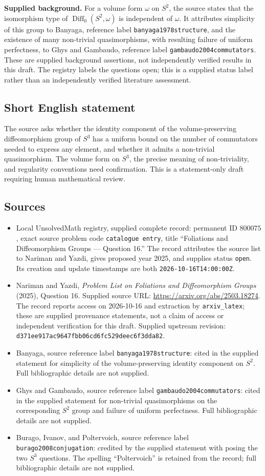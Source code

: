 \documentclass[11pt]{article}
\begin{document}
\textbf{Supplied background.} For a volume form \(\omega\) on \(S^2\), the source states that the isomorphism type of \(\operatorname{Diff}_0(S^2,\omega)\) is independent of \(\omega\). It attributes simplicity of this group to Banyaga, reference label \texttt{banyaga1978structure}, and the existence of many non-trivial quasimorphisms, with resulting failure of uniform perfectness, to Ghys and Gambaudo, reference label \texttt{gambaudo2004commutators}. These are supplied background assertions, not independently verified results in this draft. The registry labels the questions open; this is a supplied status label rather than an independently verified literature assessment.
\subsection{Short English statement}
The source asks whether the identity component of the volume-preserving diffeomorphism group of \(S^3\) has a uniform bound on the number of commutators needed to express any element, and whether it admits a non-trivial quasimorphism. The volume form on \(S^3\), the precise meaning of non-triviality, and regularity conventions need confirmation. This is a statement-only draft requiring human mathematical review.
\subsection{Sources}
\begin{itemize}
\item Local UnsolvedMath registry, supplied complete record: permanent ID \(800075\), exact source problem code \texttt{catalogue entry}, title ``Foliations and Diffeomorphism Groups --- Question 16.'' The record attributes the source list to Nariman and Yazdi, gives proposed year 2025, and supplies status \texttt{open}. Its creation and update timestamps are both \texttt{2026-10-16T14:00:00Z}.
\item Nariman and Yazdi, \emph{Problem List on Foliations and Diffeomorphism Groups} (2025), Question 16. Supplied source URL: \url{https://arxiv.org/abs/2503.18274}. The record reports access on 2026-10-16 and extraction by \texttt{arxiv\_latex}; these are supplied provenance statements, not a claim of access or independent verification for this draft. Supplied upstream revision: \texttt{d371ee917ac9647fbb06cd6fc529deec6f3dda82}.
\item Banyaga, source reference label \texttt{banyaga1978structure}: cited in the supplied statement for simplicity of the volume-preserving identity component on \(S^2\). Full bibliographic details are not supplied.
\item Ghys and Gambaudo, source reference label \texttt{gambaudo2004commutators}: cited in the supplied statement for non-trivial quasimorphisms on the corresponding \(S^2\) group and failure of uniform perfectness. Full bibliographic details are not supplied.
\item Burago, Ivanov, and Poltervoich, source reference label \texttt{burago2008conjugation}: credited by the supplied statement with posing the two \(S^3\) questions. The spelling ``Poltervoich'' is retained from the record; full bibliographic details are not supplied.
\end{itemize}
\end{document}
